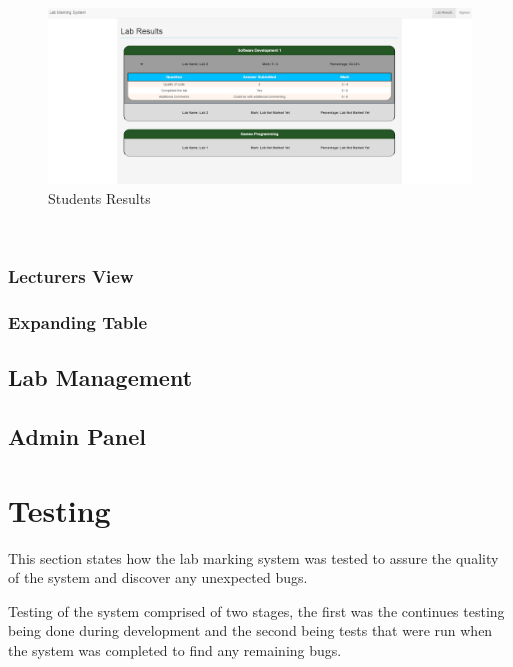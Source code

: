 \documentclass[12pt]{article}  %
\begin{document}
\begin{figure}[H]
    \centering
    \includegraphics[width=1\textwidth]{images/implementation/student-results-page.png}
    \caption{Students Results}
    \label{fig:results-student}
\end{figure}


\

\subsubsection{Lecturers View} \label{sec:results-lecturer}


\subsubsection{Expanding Table}




\subsection{Lab Management}

\subsection{Admin Panel}






\newpage
\section{Testing}

This section states how the lab marking system was tested to assure the quality of the system and discover any unexpected bugs.

Testing of the system comprised of two stages, the first was the continues testing being done during development and the second being tests that were run when the system was completed to find any remaining bugs.
\end{document}
